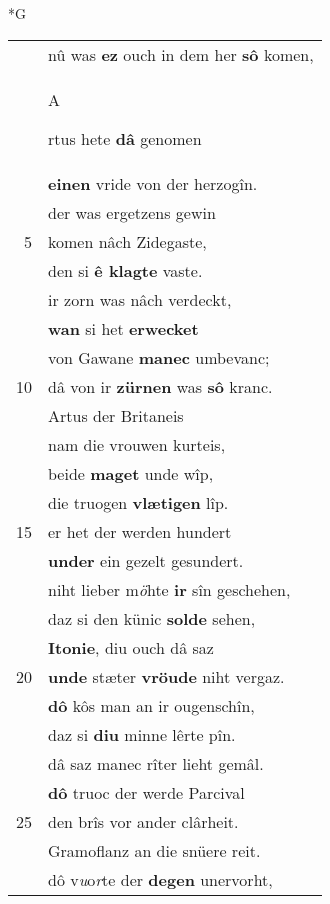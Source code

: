 \documentclass[8pt,a4paper,notitlepage]{article}
\begin{document}
\begin{table}[ht]
\begin{minipage}[t]{0.5\linewidth}
\small
\begin{center}*G
\end{center}
\begin{tabular}{rl}
 & nû was \textbf{ez} ouch in dem her \textbf{sô} komen,\\ 
 & \begin{large}A\end{large}rtus hete \textbf{dâ} genomen\\ 
 & \textbf{einen} vride von der herzogîn.\\ 
 & der was ergetzens gewin\\ 
5 & komen nâch Zidegaste,\\ 
 & den si \textbf{ê klagte} vaste.\\ 
 & ir zorn was nâch verdeckt,\\ 
 & \textbf{wan} si het \textbf{erwecket}\\ 
 & von Gawane \textbf{manec} umbevanc;\\ 
10 & dâ von ir \textbf{zürnen} was \textbf{sô} kranc.\\ 
 & Artus der Britaneis\\ 
 & nam die vrouwen kurteis,\\ 
 & beide \textbf{maget} unde wîp,\\ 
 & die truogen \textbf{vlætigen} lîp.\\ 
15 & er het der werden hundert\\ 
 & \textbf{under} ein gezelt gesundert.\\ 
 & niht lieber m\textit{ö}hte \textbf{ir} sîn geschehen,\\ 
 & daz si den künic \textbf{solde} sehen,\\ 
 & \textbf{Itonie}, diu ouch dâ saz\\ 
20 & \textbf{unde} stæter \textbf{vröude} niht vergaz.\\ 
 & \textbf{dô} kôs man an ir ougenschîn,\\ 
 & daz si \textbf{diu} minne lêrte pîn.\\ 
 & dâ saz manec rîter lieht gemâl.\\ 
 & \textbf{dô} truoc der werde Parcival\\ 
25 & den brîs vor ander clârheit.\\ 
 & Gramoflanz an die snüere reit.\\ 
 & dô v\textit{u}o\textit{r}te der \textbf{degen} unervorht,\\ 

\end{tabular}
\end{minipage}
\end{table}
\end{document}
